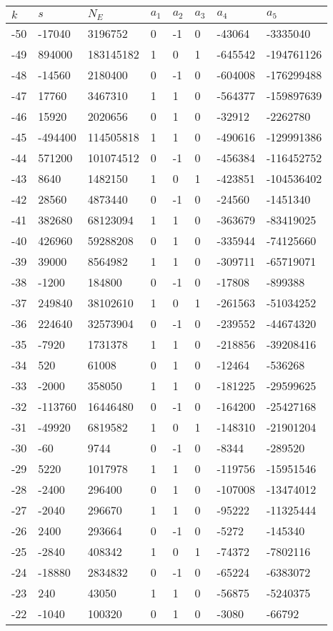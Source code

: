 \documentclass{amsart}
\begin{document}
\begin{longtable}{|l|l|l|lllll|}
\hline
$k$ & $s$ & $N_E$ & $a_1$ & $a_2$ & $a_3$ & $a_4$ & $a_5$\\
\hline
-50&-17040&3196752&0&-1&0&-43064&-3335040\\
-49&894000&183145182&1&0&1&-645542&-194761126\\
-48&-14560&2180400&0&-1&0&-604008&-176299488\\
-47&17760&3467310&1&1&0&-564377&-159897639\\
-46&15920&2020656&0&1&0&-32912&-2262780\\
-45&-494400&114505818&1&1&0&-490616&-129991386\\
-44&571200&101074512&0&-1&0&-456384&-116452752\\
-43&8640&1482150&1&0&1&-423851&-104536402\\
-42&28560&4873440&0&-1&0&-24560&-1451340\\
-41&382680&68123094&1&1&0&-363679&-83419025\\
-40&426960&59288208&0&1&0&-335944&-74125660\\
-39&39000&8564982&1&1&0&-309711&-65719071\\
-38&-1200&184800&0&-1&0&-17808&-899388\\
-37&249840&38102610&1&0&1&-261563&-51034252\\
-36&224640&32573904&0&-1&0&-239552&-44674320\\
-35&-7920&1731378&1&1&0&-218856&-39208416\\
-34&520&61008&0&1&0&-12464&-536268\\
-33&-2000&358050&1&1&0&-181225&-29599625\\
-32&-113760&16446480&0&-1&0&-164200&-25427168\\
-31&-49920&6819582&1&0&1&-148310&-21901204\\
-30&-60&9744&0&-1&0&-8344&-289520\\
-29&5220&1017978&1&1&0&-119756&-15951546\\
-28&-2400&296400&0&1&0&-107008&-13474012\\
-27&-2040&296670&1&1&0&-95222&-11325444\\
-26&2400&293664&0&-1&0&-5272&-145340\\
-25&-2840&408342&1&0&1&-74372&-7802116\\
-24&-18880&2834832&0&-1&0&-65224&-6383072\\
-23&240&43050&1&1&0&-56875&-5240375\\
-22&-1040&100320&0&1&0&-3080&-66792\\

\end{longtable}
\end{document}
